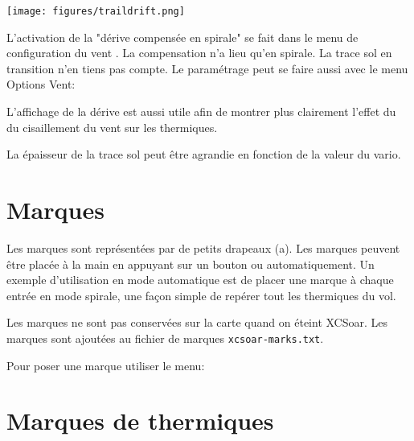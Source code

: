 \begin{center}
\texttt{[image: figures/traildrift.png]}
\end{center}

L'activation de la "dérive compensée en spirale" se fait dans le menu de configuration du vent  .  La compensation n'a lieu qu'en spirale. La trace sol en transition n'en tiens pas compte.
Le paramétrage peut se faire aussi avec le menu Options Vent:
\begin{quote}
\blink{}
\end{quote}

L'affichage de la dérive est aussi utile afin de montrer plus clairement l'effet du du cisaillement du vent sur les thermiques.

La épaisseur de la trace sol peut être agrandie en fonction de la valeur du vario.

\section{Marques}\label{sec:markers}

Les marques sont représentées par de petits drapeaux (a). Les marques peuvent être placée à la main en appuyant sur un bouton ou automatiquement. Un exemple d'utilisation en mode automatique est de placer une marque à chaque entrée en mode spirale, une façon simple de repérer tout les thermiques du vol.

Les marques ne sont pas conservées sur la carte quand on éteint XCSoar. Les marques sont ajoutées au fichier de marques  \verb|xcsoar-marks.txt|.

Pour poser une marque utiliser le menu: 
\begin{quote}
\blink{}
\end{quote}

\section{Marques de thermiques}

